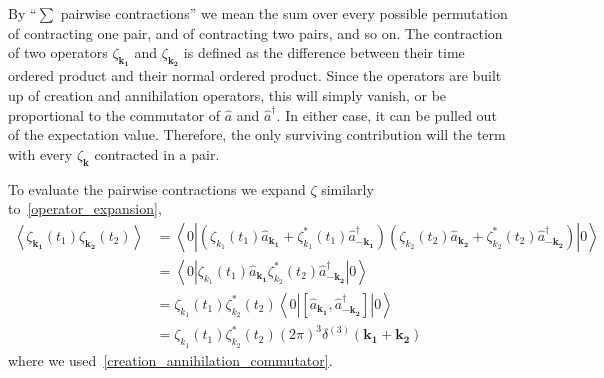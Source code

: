 By ``$\sum$ pairwise contractions'' we mean the sum over every possible permutation of contracting one pair,
and of contracting two pairs, and so on.
The contraction of two operators $\zeta_{\mathbf{k_1}}$ and $\zeta_{\mathbf{k_2}}$
is defined as the difference between their time ordered product and their normal ordered product.
Since the operators are built up of creation and annihilation operators, this will simply
vanish, or
be proportional to the commutator of $\hat{a}$ and $\hat{a}^{\dagger}$.
In either case, it can be pulled out of the expectation value.
Therefore, the only surviving contribution will the term with every $\zeta_{\mathbf{k}}$
contracted in a pair.


To evaluate the pairwise contractions we expand $\zeta$ similarly to~\eqref{operator_expansion},
\begin{align}
    \left<\zeta_{\mathbf{k_1}}(t_1)\zeta_{\mathbf{k_2}}(t_2)\right>
    &= \left<0\left|
            \left(\zeta_{k_1}(t_1)\hat{a}_\mathbf{k_1} +
            \zeta^*_{k_1}(t_1)\hat{a}^{\dagger}_{-\mathbf{k_1}}\right)
            \left(\zeta_{k_2}(t_2)\hat{a}_\mathbf{k_2} +
            \zeta^*_{k_2}(t_2)\hat{a}^{\dagger}_{-\mathbf{k_2}}\right)
        \right|0\right>\\
    &= \left<0\left|
            \zeta_{k_1}(t_1)\hat{a}_\mathbf{k_1}
            \zeta^*_{k_2}(t_2)\hat{a}^{\dagger}_{-\mathbf{k_2}}
        \right|0\right>\\
    &= \zeta_{k_1}(t_1)\zeta^*_{k_2}(t_2)\left<0\left|
            \left[\hat{a}_\mathbf{k_1},
            \hat{a}^{\dagger}_{-\mathbf{k_2}}\right]
        \right|0\right>\\
    &= \zeta_{k_1}(t_1)\zeta^*_{k_2}(t_2)(2\pi)^3\delta^{(3)}(\mathbf{k_1}+\mathbf{k_2})
\end{align}
where we used~\eqref{creation_annihilation_commutator}.


